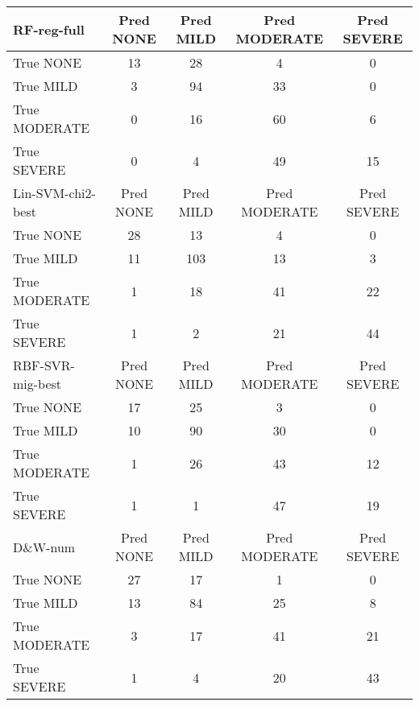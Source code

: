 \begin{table}[]
    \centering
    \begin{tabular}{|l|c|c|c|c|}
             \hline
   \cellcolor{gray!15} \textsf{RF-reg-full} & \textsf{Pred NONE} & \textsf{Pred MILD} & \textsf{Pred MODERATE} & \textsf{Pred SEVERE} \\
   \hline
   \textsf{True NONE} & \cellcolor{gray!15} 13 & 28 & 4 & 0 \\
   \textsf{True MILD} & 3 & \cellcolor{gray!15} 94 & 33 & 0 \\
   \textsf{True MODERATE} & 0 & 16 & \cellcolor{gray!15} 60 & 6 \\
   \textsf{True SEVERE} & 0 & 4 & 49 & \cellcolor{gray!15} 15 \\
   \hline
   \cellcolor{gray!15} \textsf{Lin-SVM-chi2-best} & \textsf{Pred NONE} & \textsf{Pred MILD} & \textsf{Pred MODERATE} & \textsf{Pred SEVERE} \\
   \hline
   \textsf{True NONE} & \cellcolor{gray!15} 28 & 13 & 4 & 0 \\
   \textsf{True MILD} & 11 & \cellcolor{gray!15} 103 & 13 & 3 \\
   \textsf{True MODERATE} & 1 & 18 & \cellcolor{gray!15} 41 & 22 \\
   \textsf{True SEVERE} & 1 & 2 & 21 & \cellcolor{gray!15} 44 \\
   \hline
   \cellcolor{gray!15} \textsf{RBF-SVR-mig-best} & \textsf{Pred NONE} & \textsf{Pred MILD} & \textsf{Pred MODERATE} & \textsf{Pred SEVERE} \\
   \hline
   \textsf{True NONE} & \cellcolor{gray!15} 17 & 25 & 3 & 0 \\
   \textsf{True MILD} & 10 & \cellcolor{gray!15} 90 & 30 & 0 \\
   \textsf{True MODERATE} & 1 & 26 & \cellcolor{gray!15} 43 & 12 \\
   \textsf{True SEVERE} & 1 & 1 & 47 & \cellcolor{gray!15} 19 \\
   \hline
   \cellcolor{gray!15} \textsf{D\&W-num} & \textsf{Pred NONE} & \textsf{Pred MILD} & \textsf{Pred MODERATE} & \textsf{Pred SEVERE} \\
   \hline
   \textsf{True NONE} & \cellcolor{gray!15} 27 & 17 & 1 & 0 \\
   \textsf{True MILD} & 13 & \cellcolor{gray!15} 84 & 25 & 8 \\
   \textsf{True MODERATE} & 3 & 17 & \cellcolor{gray!15} 41 & 21 \\
   \textsf{True SEVERE} & 1 & 4 & 20 & \cellcolor{gray!15} 43 \\

\end{tabular}
\end{table}

